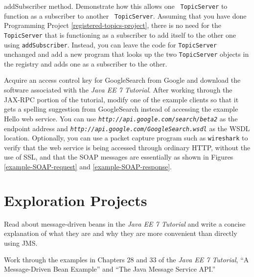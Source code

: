 \begin{chapterEnumerate}
{  addSubscriber} method.  Demonstrate how this allows one {\tt
  TopicServer} to function as a subscriber to another {\tt
  TopicServer}.  Assuming that you have done Programming Project \ref{registered-topics-project}, there is no need for the \texttt{TopicServer} that is functioning as a subscriber to add itself to the other one using \texttt{addSubscriber}.  Instead, you can leave the code for \texttt{TopicServer} unchanged and add a new program that looks up the two \texttt{TopicServer} objects in the registry and adds one as a subscriber to the other.
\item\label{jax-rpc-project}
Acquire an access control key for GoogleSearch from Google and
download the software associated with the \textit{Java EE 7 Tutorial}.  After
working through the JAX-RPC portion of the tutorial, modify one of the
example clients so that it gets a spelling suggestion
from GoogleSearch instead of accessing the example Hello web service.
You can use \textit{\nolinkurl{http://api.google.com/search/beta2}} as the endpoint
address and \textit{\nolinkurl{http://api.google.com/GoogleSearch.wsdl}} as the WSDL
location.  Optionally, you can use a packet capture program such as
{\tt wireshark} to verify that the web service is being accessed through
ordinary HTTP, without the use of SSL, and that the SOAP messages are
essentially as shown in Figures \ref{example-SOAP-request} and
\ref{example-SOAP-response}.
\end{chapterEnumerate}

\section*{Exploration Projects}
\begin{chapterEnumerate}
\item
Read about message-driven beans in the \textit{Java EE 7 Tutorial} and write a
concise explanation of what they are and why they are more convenient
than directly using JMS.
\item
Work through the examples in Chapters 28 and 33 of the
\textit{Java EE 7 Tutorial}, ``A Message-Driven Bean Example'' and
``The Java Message Service API.''
\end{chapterEnumerate}


